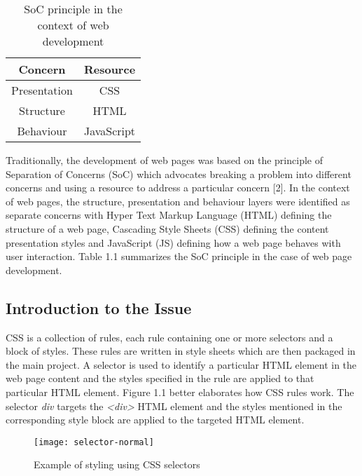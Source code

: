 \documentclass[12pt]{article}
\begin{document}
\vspace{0.5cm}

\begin{table}[h]
	\centering
	\begin{tabular}{|c|c|}
		\hline
		\textbf{Concern} & \textbf{Resource} \\ 
		\hline
		Presentation & CSS \\
		\hline 
		Structure & HTML \\
		\hline
		Behaviour & JavaScript \\
		\hline
	\end{tabular}
	\caption{SoC principle in the context of web development}
\end{table}

\vspace{0.5cm}

Traditionally, the development of web pages was based on the principle of Separation of Concerns (SoC) which advocates breaking a problem into different concerns and using a resource to address a particular concern [2]. In the context of web pages, the structure, presentation and behaviour layers were identified as separate concerns with Hyper Text Markup Language (HTML) defining the structure of a web page, Cascading Style Sheets (CSS) defining the content presentation styles and JavaScript (JS) defining how a web page behaves with user interaction. Table 1.1 summarizes the SoC principle in the case of web page development.

\subsection{Introduction to the Issue}
CSS is a collection of rules, each rule containing one or more selectors and a block of styles. These rules are written in style sheets which are then packaged in the main project. A selector is used to identify a particular HTML element in the web page content and the styles specified in the rule are applied to that particular HTML element. Figure 1.1 better elaborates how CSS rules work. The selector \textit{div} targets the \textit{<div>} HTML element and the styles mentioned in the corresponding style block are applied to the targeted HTML element.

\vspace{0.5cm}

\begin{figure}[h]
\texttt{[image: selector-normal]}
\centering
\caption{Example of styling using CSS selectors}
\end{figure}
\end{document}
